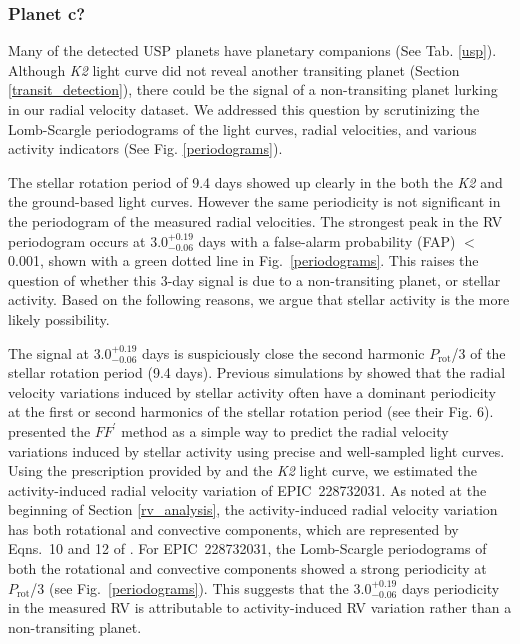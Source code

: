 \documentclass[twocolumn]{aastex61}
\begin{document}
\subsubsection{Planet c?}\label{possible_planetc}
Many of the detected USP planets have planetary companions (See Tab. \ref{usp}). Although {\it K2} light curve did not reveal another transiting planet (Section \ref{transit_detection}), there could be the
signal of a non-transiting
planet lurking in our radial velocity dataset. We addressed this question by scrutinizing the Lomb-Scargle periodograms of the light curves, radial velocities, and various activity indicators (See Fig. \ref{periodograms}).

The stellar rotation period of 9.4 days showed up clearly in the both the {\it K2} and the ground-based light curves. However the same periodicity is not significant in the periodogram of the measured
radial velocities. The strongest peak in the RV periodogram occurs at $3.0^{+0.19}_{-0.06}$ days with a
false-alarm probability (FAP) $<$0.001, shown with a green dotted line in Fig.~\ref{periodograms}.
This raises the question of whether this 3-day signal is due to a non-transiting planet,
or stellar activity. Based on the following reasons, we argue that stellar activity is the more likely
possibility.

The signal at $3.0^{+0.19}_{-0.06}$ days is suspiciously close the second harmonic $P_{\text{rot}}$/3 of the stellar rotation period (9.4 days). Previous simulations by \citet{Vanderburg2016RV} showed that the radial velocity variations induced by stellar activity often have a dominant periodicity at the first or second harmonics of the stellar rotation period (see their Fig. 6). \citet{Aigrain2012} presented the $FF^\prime$ method as a simple way to predict the radial velocity variations induced by stellar activity using precise and well-sampled light curves. Using the prescription provided by \citet{Aigrain2012} and the {\it K2} light curve, we estimated the activity-induced radial velocity variation of EPIC~228732031. As noted at the beginning of Section \ref{rv_analysis}, the activity-induced radial velocity variation has both rotational and convective components, which are represented
by Eqns.\ 10 and 12 of \citet{Aigrain2012}. For EPIC~228732031, the Lomb-Scargle periodograms of both the rotational and convective components showed a strong periodicity at $P_{\text{rot}}$/3 (see Fig.~\ref{periodograms}). This suggests that the $3.0^{+0.19}_{-0.06}$ days periodicity in the measured RV is attributable to activity-induced RV variation rather than a non-transiting planet.
\end{document}

